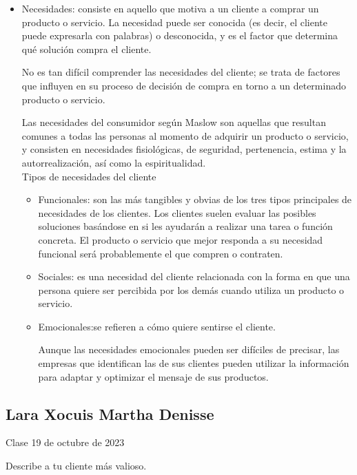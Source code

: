 \documentclass[letterpaper,12pt]{article}
\begin{document}
\begin{sloppypar}
\begin{itemize}
    \item Necesidades:  consiste en aquello que motiva a un cliente a comprar un producto o servicio. La necesidad puede ser conocida (es decir, el cliente puede expresarla con palabras) o desconocida, y es el factor que determina qué solución compra el cliente.
    
    No es tan difícil comprender las necesidades del cliente; se trata de factores que influyen en su proceso de decisión de compra en torno a un determinado producto o servicio.

    Las necesidades del consumidor según Maslow son aquellas que resultan comunes a todas las personas al momento de adquirir un producto o servicio, y consisten en necesidades fisiológicas, de seguridad, pertenencia, estima y la autorrealización, así como la espiritualidad.
    \vspace{0.3cm}\\ 
    Tipos de necesidades del cliente 
    \begin{itemize}
        \item Funcionales: son las más tangibles y obvias de los tres tipos principales de necesidades de los clientes. Los clientes suelen evaluar las posibles soluciones basándose en si les ayudarán a realizar una tarea o función concreta. El producto o servicio que mejor responda a su necesidad funcional será probablemente el que compren o contraten.
        \item Sociales:  es una necesidad del cliente relacionada con la forma en que una persona quiere ser percibida por los demás cuando utiliza un producto o servicio. 
        \item Emocionales:se refieren a cómo quiere sentirse el cliente.

        Aunque las necesidades emocionales pueden ser difíciles de precisar, las empresas que identifican las de sus clientes pueden utilizar la información para adaptar y optimizar el mensaje de sus productos.
    \end{itemize}

\end{itemize}
\newpage
\subsection*{Lara Xocuis Martha Denisse}
Clase 19 de octubre de 2023

Describe a tu cliente más valioso.


\end{sloppypar}
\end{document}
